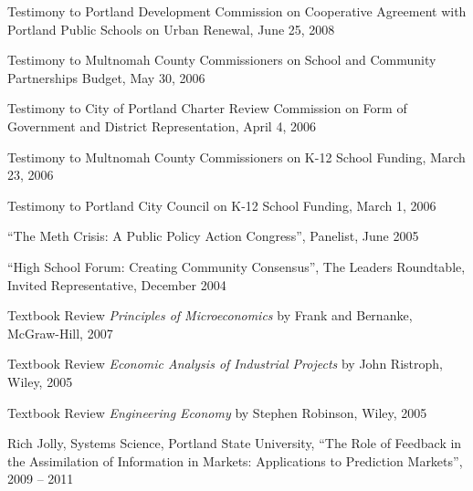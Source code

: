 \documentclass[Computer Science]{vita}
\begin{document}
\begin{vita}
\begin{Community Outreach}
  \item Testimony to Portland Development Commission on Cooperative
    Agreement with Portland Public Schools on Urban Renewal, June 25,
    2008

  \item Testimony to Multnomah County Commissioners on School and
    Community Partnerships Budget, May 30, 2006

  \item Testimony to City of Portland Charter Review Commission on
    Form of Government and District Representation, April 4, 2006

  \item Testimony to Multnomah County Commissioners on K-12 School
    Funding, March 23, 2006

  \item Testimony to Portland City Council on K-12 School Funding,
    March 1, 2006

  \item ``The Meth Crisis: A Public Policy Action Congress'',
    Panelist, June 2005

  \item ``High School Forum: Creating Community Consensus'', The
    Leaders Roundtable, Invited Representative, December 2004
  \end{Community Outreach}

  \begin{Instructional Activities}

    \begin{Reviews}
    \item Textbook Review \emph{Principles of Microeconomics} by
      Frank and Bernanke, McGraw-Hill, 2007

    \item Textbook Review \emph{Economic Analysis of Industrial
        Projects} by John Ristroph, Wiley, 2005

    \item Textbook Review \emph{Engineering Economy} by Stephen
      Robinson, Wiley, 2005
    \end{Reviews}

    \begin{Ph.D. Thesis Committee}
    \item Rich Jolly, Systems Science, Portland State University,
      ``The Role of Feedback in the Assimilation of Information in
      Markets: Applications to Prediction Markets'', 2009 -- 2011


    \end{Ph.D. Thesis Committee}


\end{Instructional Activities}
\end{vita}
\end{document}
